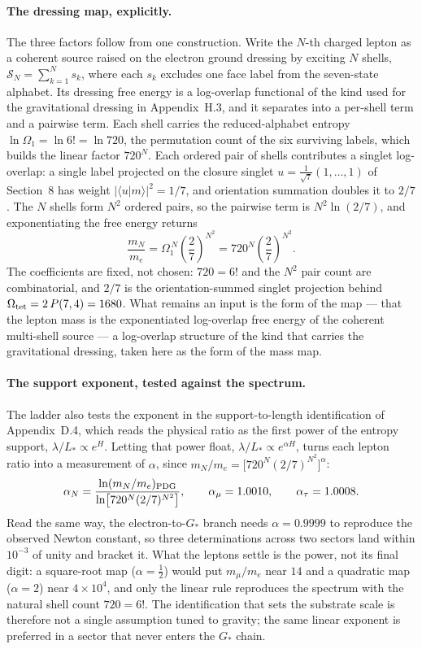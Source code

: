 \documentclass[11pt]{article}
\begin{document}
\paragraph{The dressing map, explicitly.}
The three factors follow from one construction. Write the $N$-th charged lepton as a coherent source raised on the electron ground dressing by exciting $N$ shells, $\mathcal S_N=\sum_{k=1}^{N}s_k$, where each $s_k$ excludes one face label from the seven-state alphabet. Its dressing free energy is a log-overlap functional of the kind used for the gravitational dressing in Appendix~H.3, and it separates into a per-shell term and a pairwise term. Each shell carries the reduced-alphabet entropy $\ln\Omega_1=\ln 6!=\ln 720$, the permutation count of the six surviving labels, which builds the linear factor $720^N$. Each ordered pair of shells contributes a singlet log-overlap: a single label projected on the closure singlet $u=\tfrac1{\sqrt7}(1,\dots,1)$ of Section~8 has weight $|\langle u|m\rangle|^2=1/7$, and orientation summation doubles it to $2/7$. The $N$ shells form $N^2$ ordered pairs, so the pairwise term is $N^2\ln(2/7)$, and exponentiating the free energy returns
\[
\frac{m_N}{m_e}=\Omega_1^{\,N}\left(\frac{2}{7}\right)^{N^2}=720^N\left(\frac{2}{7}\right)^{N^2}.
\]
The coefficients are fixed, not chosen: $720=6!$ and the $N^2$ pair count are combinatorial, and $2/7$ is the orientation-summed singlet projection behind $\Omega_{\rm tet}=2\,P(7,4)=1680$. What remains an input is the form of the map --- that the lepton mass is the exponentiated log-overlap free energy of the coherent multi-shell source --- a log-overlap structure of the kind that carries the gravitational dressing, taken here as the form of the mass map.

\paragraph{The support exponent, tested against the spectrum.}
The ladder also tests the exponent in the support-to-length identification of Appendix~D.4, which reads the physical ratio as the first power of the entropy support, $\lambda/L_*\propto e^{H}$. Letting that power float, $\lambda/L_*\propto e^{\alpha H}$, turns each lepton ratio into a measurement of $\alpha$, since $m_N/m_e=\bigl[720^N(2/7)^{N^2}\bigr]^{\alpha}$:
\[
\alpha_N=\frac{\ln(m_N/m_e)_{\rm PDG}}{\ln\bigl[720^N(2/7)^{N^2}\bigr]},
\qquad
\alpha_\mu=1.0010,
\qquad
\alpha_\tau=1.0008.
\]
Read the same way, the electron-to-$G_*$ branch needs $\alpha=0.9999$ to reproduce the observed Newton constant, so three determinations across two sectors land within $10^{-3}$ of unity and bracket it. What the leptons settle is the power, not its final digit: a square-root map ($\alpha=\tfrac12$) would put $m_\mu/m_e$ near $14$ and a quadratic map ($\alpha=2$) near $4\times10^{4}$, and only the linear rule reproduces the spectrum with the natural shell count $720=6!$. The identification that sets the substrate scale is therefore not a single assumption tuned to gravity; the same linear exponent is preferred in a sector that never enters the $G_*$ chain.
\end{document}

